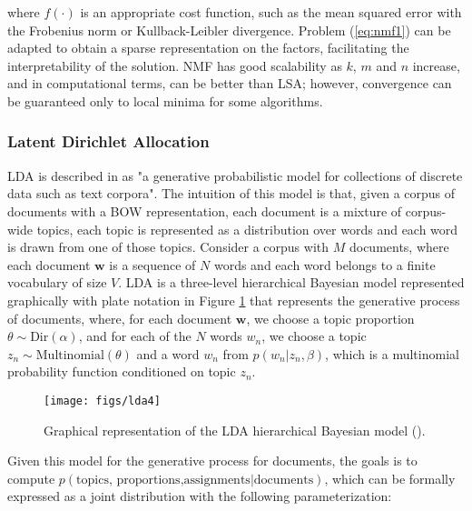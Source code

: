 \documentclass{article}
\begin{document}
where $f(\cdot)$ is an appropriate cost function, such as the mean squared error with the Frobenius norm or Kullback-Leibler divergence. Problem (\ref{eq:nmf1}) can be adapted to obtain a sparse representation on the factors, facilitating the interpretability of the solution. NMF has good scalability as $k$, $m$ and $n$ increase, and in computational terms, can be better than LSA; however, convergence can be guaranteed only to local minima for some algorithms.

\subsubsection{Latent Dirichlet Allocation}

LDA is described in \cite{lda2003} as "a generative probabilistic model for collections of discrete data such as text corpora". The intuition of this model is that, given a corpus of documents with a BOW representation, each document is a mixture of corpus-wide topics, each topic is represented as a distribution over words and each word is drawn from one of those topics. Consider a corpus with $M$ documents, where each document $\mathbf{w}$ is a sequence of $N$ words and each word belongs to a finite vocabulary of size $V$. LDA is a three-level hierarchical Bayesian model represented graphically with plate notation in Figure \ref{fig:lda_model} that represents the generative process of documents, where, for each document $\mathbf{w}$, we choose a topic proportion $\theta \sim \text{Dir}(\alpha)$, and for each of the $N$ words $w_n$, we choose a topic $z_n\sim \text{Multinomial}(\theta)$ and a word $w_n$ from $p(w_n|z_n,\beta)$, which is a multinomial probability function conditioned on topic $z_n$. 

\begin{figure}[H]
  \centering
  \texttt{[image: figs/lda4]}
   \caption{Graphical representation of the LDA hierarchical Bayesian model (\cite{lda2003}).}
    \label{fig:lda_model}
\end{figure}

Given this model for the generative process for documents, the goals is to compute $p(\text{topics, proportions,assignments}|\text{documents})$, which can be formally expressed as a joint distribution with the following parameterization:
\end{document}
